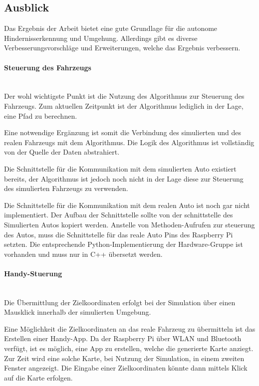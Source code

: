 \subsection{Ausblick}
Das Ergebnis der Arbeit bietet eine gute Grundlage für die autonome Hindernisserkennung und Umgehung.
Allerdings gibt es diverse Verbesserungsvorschläge und Erweiterungen, welche das Ergebnis verbessern.

\paragraph{Steuerung des Fahrzeugs} \mbox{}\\
Der wohl wichtigste Punkt ist die Nutzung des Algorithmus zur Steuerung des Fahrzeugs.
Zum aktuellen Zeitpunkt ist der Algorithmus lediglich in der Lage, eine Pfad zu berechnen.

Eine notwendige Ergänzung ist somit die Verbindung des simulierten und des realen Fahrzeugs mit dem Algorithmus.
Die Logik des Algorithmus ist vollständig von der Quelle der Daten abstrahiert.

Die Schnittstelle für die Kommunikation mit dem simulierten Auto existiert bereits,
der Algorithmus ist jedoch noch nicht in der Lage diese zur Steuerung des simulierten Fahrzeugs zu verwenden.

Die Schnittstelle für die Kommunikation mit dem realen Auto ist noch gar nicht implementiert.
Der Aufbau der Schnittstelle sollte von der schnittstelle des Simulierten Autos kopiert werden.
Anstelle von Methoden-Aufrufen zur steuerung des Autos, muss die Schnittstelle für das reale Auto Pins des Raspberry Pi setzten.
Die entsprechende Python-Implementierung der Hardware-Gruppe ist vorhanden und muss nur in C++ übersetzt werden.

\paragraph{Handy-Stuerung} \mbox{}\\
Die Übermittlung der Zielkoordinaten erfolgt bei der Simulation über einen Mausklick innerhalb der simulierten Umgebung.

Eine Möglichkeit die Zielkoordinaten an das reale Fahrzeug zu übermitteln ist das Erstellen einer Handy-App.
Da der Raspberry Pi über WLAN und Bluetooth verfügt, ist es möglich, eine App zu erstellen, welche die generierte Karte anziegt.
Zur Zeit wird eine solche Karte, bei Nutzung der Simulation, in einem zweiten Fenster angezeigt.
Die Eingabe einer Zielkoordinaten könnte dann mittels Klick auf die Karte erfolgen.

